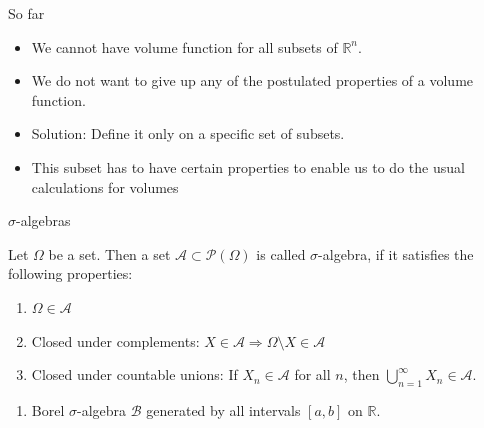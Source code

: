 \documentclass{beamer}
\newcommand{\RR}{\mathbb{R}}
\begin{document}
\begin{frame}{So far}
  \begin{itemize}
  \item We cannot have volume function for all subsets of $\RR^n$.
  \item We do not want to give up any of the postulated properties
    of a volume function.
  \item Solution: Define it only on a specific set of subsets.
  \item This subset has to have certain properties to enable us
    to do the usual calculations for volumes
  \end{itemize}
\end{frame}

\begin{frame}{$\sigma$-algebras}
  \begin{definition}
    Let $\Omega$ be a set. Then a set $\mathcal{A} \subset \mathcal{P}(\Omega)$
    is called $\sigma$-algebra, if it satisfies the following properties:
    \begin{enumerate}
    \item $\Omega \in \mathcal{A}$
    \item Closed under complements: $X \in \mathcal{A} \Rightarrow
      \Omega\setminus X \in \mathcal{A}$
    \item Closed under countable unions: If $X_n \in \mathcal{A}$ for all $n$,
      then $\bigcup_{n=1}^\infty X_n \in \mathcal{A}$.
    \end{enumerate}
  \end{definition}

  \begin{example}
    \begin{enumerate}
    \item Borel $\sigma$-algebra $\mathcal{B}$ generated by all intervals
      $[a,b]$ on $\RR$.
    \end{enumerate}
  \end{example}
\end{frame}
\end{document}
